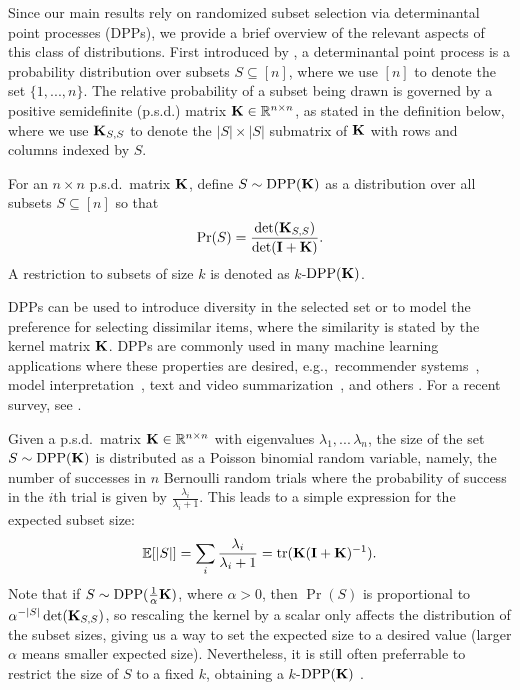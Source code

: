 \documentclass{article}
\begin{document}
Since our main results rely on randomized subset selection via
determinantal point processes (DPPs), we provide a brief overview of
the relevant aspects of this class of distributions.
First introduced by \citet{Macchi1975}, a determinantal point process is a
probability distribution over subsets $S \subseteq[n]$, where we use $[n]$
to denote the set $\{1,...,n\}$. The relative probability of a subset being drawn is 
governed by a positive semidefinite (p.s.d.) matrix $\mathbf K \in \mathbb R^{n\times n}$,
as stated in the definition below, where we use $\mathbf K_{S,S}$ to denote
the $|S|\times |S|$ submatrix of $\mathbf K$ with rows and columns indexed
by $S$.
\begin{definition}\label{d:dpp}
  For an $n\times n$ p.s.d.~matrix $\mathbf K$, define $S\sim
  {\mathrm{DPP}}(\mathbf K)$ as a distribution 
  over all subsets $S\subseteq [n]$ so
  that
  \[\Pr(S)=\frac{\det(\mathbf K_{S,S})}{\det(\mathbf I+\mathbf K)}.\]
A restriction to subsets of size $k$ is denoted as $k$-${\mathrm{DPP}}(\mathbf K)$.
\end{definition}
DPPs can be used to introduce diversity in the selected set or to
model the preference for selecting dissimilar items, where the
similarity is stated by the kernel matrix $\mathbf K$. DPPs are
commonly used in many machine learning applications where these
properties are desired, e.g.,~recommender systems~\citep{Warlop2019}, model
interpretation~\citep{kim:2016MMD}, text
and video summarization~\citep{dpp-video}, and others
\citep{dpp-ml}. For a recent survey, see \cite{dpps-in-randnla}.

Given a p.s.d.~matrix $\mathbf K \in \mathbb R^{n \times n}$ with eigenvalues
$\lambda_1,...\, \lambda_n$, the size of the set $S \sim {\mathrm{DPP}}(\mathbf K)$
is distributed as a Poisson binomial random variable, namely, the
number of successes in $n$ Bernoulli random trials where the
probability of success in the $i$th trial is given by 
$\frac{\lambda_i}{\lambda_i+1}$. This leads to a simple
expression for the expected subset size:
\begin{align}
\mathbb E[|S|] = \sum_i \frac{\lambda_i}{\lambda_i + 1} = \mathrm{tr}(\mathbf K(\mathbf I + \mathbf K)^{-1}).\label{eq:size}
\end{align}
Note that if $S\sim{\mathrm{DPP}}(\frac1\alpha\mathbf K)$, where $\alpha>0$, then
$\Pr(S)$ is proportional to $\alpha^{-|S|}\det(\mathbf K_{S,S})$, so rescaling the kernel
by a scalar only affects the distribution of the subset sizes, giving
us a way to set the expected size to a desired value (larger $\alpha$
means smaller expected size).
Nevertheless, it is still often preferrable to restrict the size of
$S$ to a fixed $k$, obtaining a $k$-${\mathrm{DPP}}(\mathbf K)$ \citep{k-dpp}.
\end{document}
